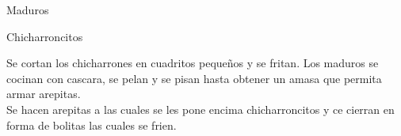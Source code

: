 
\begin{ingredientes}
\item Maduros
\item Chicharroncitos
\end{ingredientes}
\preparacion
Se cortan los chicharrones en cuadritos pequeños y se fritan. Los maduros se cocinan con cascara, se pelan y se pisan hasta obtener un amasa que permita armar arepitas.\\

Se hacen arepitas a las cuales se les pone encima chicharroncitos y ce cierran en forma de bolitas las cuales se frien.